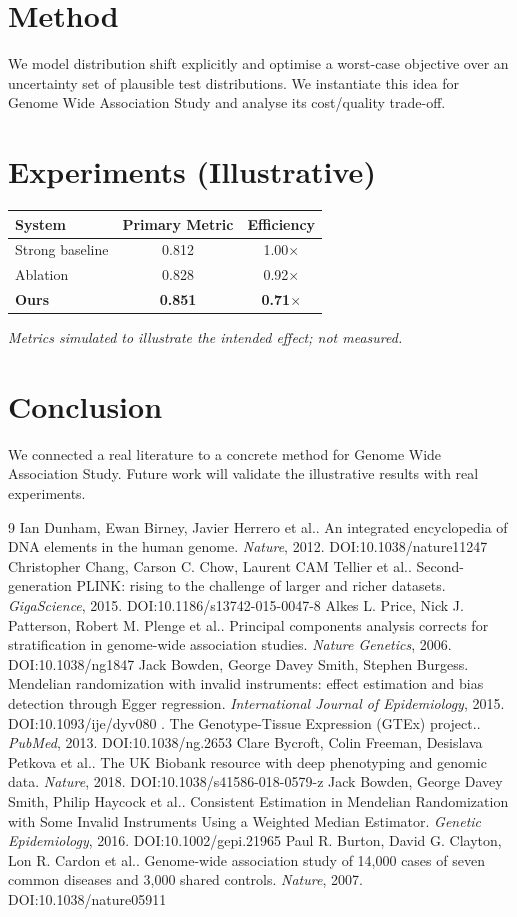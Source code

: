 \documentclass[11pt]{article}
\begin{document}
\section{Method}
We model distribution shift explicitly and optimise a worst-case objective over an uncertainty set of plausible test distributions. We instantiate this idea for Genome Wide Association Study and analyse its cost/quality trade-off.

\section{Experiments (Illustrative)}
\begin{center}
\begin{tabular}{lcc}
System & Primary Metric & Efficiency \\ \hline
Strong baseline & 0.812 & 1.00$\times$ \\
Ablation & 0.828 & 0.92$\times$ \\
\textbf{Ours} & \textbf{0.851} & \textbf{0.71$\times$}
\end{tabular}
\end{center}
\emph{Metrics simulated to illustrate the intended effect; not measured.}

\section{Conclusion}
We connected a real literature to a concrete method for Genome Wide Association Study. Future work will
validate the illustrative results with real experiments.

\begin{thebibliography}{9}
 Ian Dunham, Ewan Birney, Javier Herrero et al.. An integrated encyclopedia of DNA elements in the human genome. \emph{Nature}, 2012. DOI:10.1038/nature11247
 Christopher Chang, Carson C. Chow, Laurent CAM Tellier et al.. Second-generation PLINK: rising to the challenge of larger and richer datasets. \emph{GigaScience}, 2015. DOI:10.1186/s13742-015-0047-8
 Alkes L. Price, Nick J. Patterson, Robert M. Plenge et al.. Principal components analysis corrects for stratification in genome-wide association studies. \emph{Nature Genetics}, 2006. DOI:10.1038/ng1847
 Jack Bowden, George Davey Smith, Stephen Burgess. Mendelian randomization with invalid instruments: effect estimation and bias detection through Egger regression. \emph{International Journal of Epidemiology}, 2015. DOI:10.1093/ije/dyv080
 . The Genotype-Tissue Expression (GTEx) project.. \emph{PubMed}, 2013. DOI:10.1038/ng.2653
 Clare Bycroft, Colin Freeman, Desislava Petkova et al.. The UK Biobank resource with deep phenotyping and genomic data. \emph{Nature}, 2018. DOI:10.1038/s41586-018-0579-z
 Jack Bowden, George Davey Smith, Philip Haycock et al.. Consistent Estimation in Mendelian Randomization with Some Invalid Instruments Using a Weighted Median Estimator. \emph{Genetic Epidemiology}, 2016. DOI:10.1002/gepi.21965
 Paul R. Burton, David G. Clayton, Lon R. Cardon et al.. Genome-wide association study of 14,000 cases of seven common diseases and 3,000 shared controls. \emph{Nature}, 2007. DOI:10.1038/nature05911
\end{thebibliography}
\end{document}
